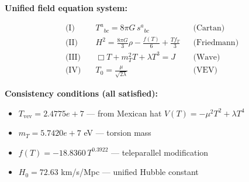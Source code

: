 
\textbf{Unified field equation system:}

\begin{align}
  \text{(I)} \quad & T^a{}_{bc} = 8\pi G \, s^a{}_{bc} && \text{(Cartan)} \\
  \text{(II)} \quad & H^2 = \frac{8\pi G}{3}\rho - \frac{f(T)}{6} + \frac{Tf_T}{3} && \text{(Friedmann)} \\
  \text{(III)} \quad & \Box T + m_T^2 T + \lambda T^3 = J && \text{(Wave)} \\
  \text{(IV)} \quad & T_0 = \frac{\mu}{\sqrt{2\lambda}} && \text{(VEV)}
\end{align}

\textbf{Consistency conditions (all satisfied):}
\begin{itemize}
  \item $T_{\text{vev}} = 2.4775e+7$ — from Mexican hat $V(T) = -\mu^2 T^2 + \lambda T^4$
  \item $m_T = 5.7420e+7$ eV — torsion mass
  \item $f(T) = -18.8360 \, T^{0.3922}$ — teleparallel modification
  \item $H_0 = 72.63$ km/s/Mpc — unified Hubble constant
\end{itemize}
